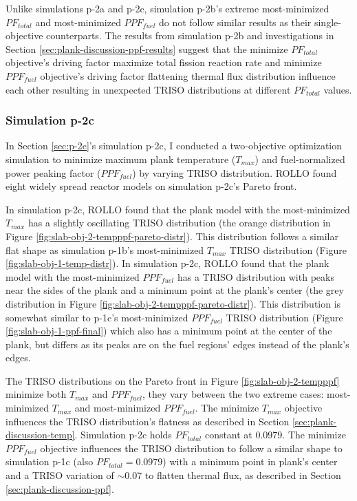 Unlike simulations p-2a and p-2c, simulation p-2b's extreme most-minimized $PF_{total}$ 
and most-minimized $PPF_{fuel}$ do not follow similar results as their single-objective 
counterparts.  
The results from simulation p-2b and investigations in Section 
\ref{sec:plank-discussion-ppf-results} suggest that the minimize $PF_{total}$ 
objective's driving factor maximize total fission reaction rate and 
minimize $PPF_{fuel}$ objective's driving factor flattening thermal flux distribution 
influence each other resulting in unexpected TRISO distributions at different 
$PF_{total}$ values. 

\subsubsection{Simulation p-2c}
In Section \ref{sec:p-2c}'s simulation p-2c, I conducted a two-objective 
optimization simulation to minimize maximum plank temperature ($T_{max}$) and 
fuel-normalized power peaking factor ($PPF_{fuel}$) by varying TRISO distribution. 
\gls{ROLLO} found eight widely spread reactor models on simulation p-2c's Pareto 
front. 

In simulation p-2c, \gls{ROLLO} found that the plank model with the most-minimized 
$T_{max}$ has a slightly oscillating TRISO distribution
(the orange distribution in Figure \ref{fig:slab-obj-2-tempppf-pareto-distr}). 
This distribution follows a similar flat shape as simulation p-1b's most-minimized 
$T_{max}$ TRISO distribution (Figure \ref{fig:slab-obj-1-temp-distr}).
In simulation p-2c, \gls{ROLLO} found that the plank model with the most-minimized 
$PPF_{fuel}$ has a TRISO distribution with peaks near the sides of the plank and a 
minimum point at the plank's center (the grey distribution in Figure 
\ref{fig:slab-obj-2-tempppf-pareto-distr}). 
This distribution is somewhat similar to p-1c's most-minimized $PPF_{fuel}$ TRISO 
distribution (Figure \ref{fig:slab-obj-1-ppf-final}) which also has a minimum point 
at the center of the plank, but differs as its peaks are on the fuel regions' edges 
instead of the plank's edges. 

The \gls{TRISO} distributions on the Pareto front in Figure \ref{fig:slab-obj-2-tempppf} 
minimize both $T_{max}$ and $PPF_{fuel}$, they vary between the two extreme cases: 
most-minimized $T_{max}$ and most-minimized $PPF_{fuel}$. 
The minimize $T_{max}$ objective influences the TRISO distribution's flatness as 
described in Section \ref{sec:plank-discussion-temp}.
Simulation p-2c holds $PF_{total}$ constant at 0.0979. 
The minimize $PPF_{fuel}$ objective influences the TRISO distribution to follow 
a similar shape to simulation p-1c (also $PF_{total} = 0.0979$) with a minimum point in 
plank's center and a TRISO variation of $\sim0.07$ to flatten thermal flux, as 
described in Section \ref{sec:plank-discussion-ppf}. 

